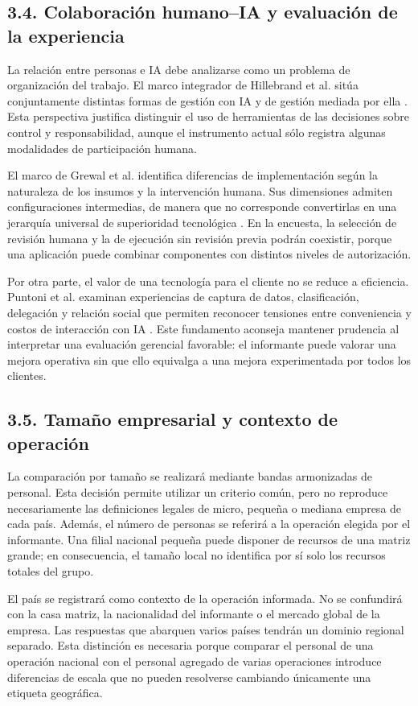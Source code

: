 \documentclass[12pt,letterpaper]{article}
\begin{document}
\subsection*{3.4. Colaboración humano--IA y evaluación de la experiencia}
La relación entre personas e IA debe analizarse como un problema de organización del trabajo. El marco integrador de Hillebrand et al. sitúa conjuntamente distintas formas de gestión con IA y de gestión mediada por ella \citep{hillebrand}. Esta perspectiva justifica distinguir el uso de herramientas de las decisiones sobre control y responsabilidad, aunque el instrumento actual sólo registra algunas modalidades de participación humana.

El marco de Grewal et al. identifica diferencias de implementación según la naturaleza de los insumos y la intervención humana. Sus dimensiones admiten configuraciones intermedias, de manera que no corresponde convertirlas en una jerarquía universal de superioridad tecnológica \citep{grewal}. En la encuesta, la selección de revisión humana y la de ejecución sin revisión previa podrán coexistir, porque una aplicación puede combinar componentes con distintos niveles de autorización.

Por otra parte, el valor de una tecnología para el cliente no se reduce a eficiencia. Puntoni et al. examinan experiencias de captura de datos, clasificación, delegación y relación social que permiten reconocer tensiones entre conveniencia y costos de interacción con IA \citep{puntoni}. Este fundamento aconseja mantener prudencia al interpretar una evaluación gerencial favorable: el informante puede valorar una mejora operativa sin que ello equivalga a una mejora experimentada por todos los clientes.

\subsection*{3.5. Tamaño empresarial y contexto de operación}
La comparación por tamaño se realizará mediante bandas armonizadas de personal. Esta decisión permite utilizar un criterio común, pero no reproduce necesariamente las definiciones legales de micro, pequeña o mediana empresa de cada país. Además, el número de personas se referirá a la operación elegida por el informante. Una filial nacional pequeña puede disponer de recursos de una matriz grande; en consecuencia, el tamaño local no identifica por sí solo los recursos totales del grupo.

El país se registrará como contexto de la operación informada. No se confundirá con la casa matriz, la nacionalidad del informante o el mercado global de la empresa. Las respuestas que abarquen varios países tendrán un dominio regional separado. Esta distinción es necesaria porque comparar el personal de una operación nacional con el personal agregado de varias operaciones introduce diferencias de escala que no pueden resolverse cambiando únicamente una etiqueta geográfica.
\end{document}

